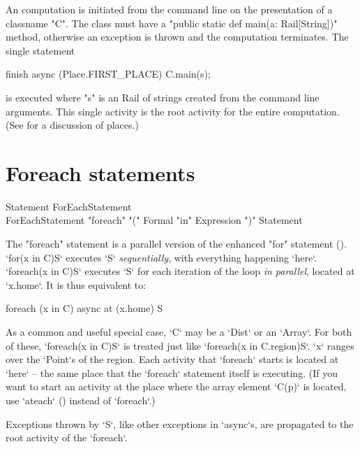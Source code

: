 An \Xten{} computation is initiated from the command line on the
presentation of a classname \xcd"C". The class must have a
\xcd"public static def main(a: Rail[String])" method, otherwise an
exception is thrown
and the computation terminates.  The single statement
\begin{xten}
finish async (Place.FIRST_PLACE) {
  C.main(s);
}
\end{xten} 
\noindent is executed where \xcd"s" is an Rail of strings created
from the command line arguments. This single activity is the root activity
for the entire computation. (See  for a discussion of
places.)


\section{Foreach statements}\label{foreach-section}


\begin{grammar}
Statement \: ForEachStatement \\
ForEachStatement \: 
      \xcd"foreach" \xcd"(" Formal \xcd"in" Expression \xcd")"
          Statement 
\end{grammar}


The \xcd"foreach" statement is a parallel version of the enhanced \xcd"for"
statement (). \xcd`for(x in C)S` executes \xcd`S` {\em
  sequentially}, with everything happening \xcd`here`. \xcd`foreach(x in C)S`
executes \xcd`S` for each iteration of the loop {\em in parallel}, located at
\xcd`x.home`. It is thus equivalent to:
\begin{xten}
foreach (x in C)
  async at (x.home) S
\end{xten}

As a common and useful special case, \xcd`C` may be a \xcd`Dist` or an
\xcd`Array`.  For both of these, \xcd`foreach(x in C)S` is treated just like 
\xcd`foreach(x in C.region)S`.  \xcd`x` ranges over the \xcd`Point`s of the
region.  Each activity that \xcd`foreach` starts is located at \xcd`here` --
the same place that the \xcd`foreach` statement itself is executing.  (If you
want to start an activity at the place where the array element \xcd`C(p)` is
located, use \xcd`ateach` () instead of \xcd`foreach`.)

Exceptions thrown by \xcd`S`, like other exceptions in \xcd`async`s, are
propagated to the root activity of the \xcd`foreach`.  



